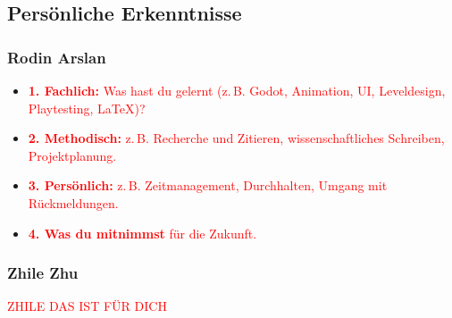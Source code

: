 \documentclass[../Main.tex]{subfiles}
\begin{document}
\subsection{Persönliche Erkenntnisse}

\subsubsection{Rodin Arslan}

\begin{itemize}[leftmargin=1.5cm]
    \item \textcolor{red}{\textbf{1. Fachlich:} Was hast du gelernt (z.\,B. Godot, Animation, UI, Leveldesign, Playtesting, \LaTeX)?}
    \item \textcolor{red}{\textbf{2. Methodisch:} z.\,B. Recherche und Zitieren, wissenschaftliches Schreiben, Projektplanung.}
    \item \textcolor{red}{\textbf{3. Persönlich:} z.\,B. Zeitmanagement, Durchhalten, Umgang mit Rückmeldungen.}
    \item \textcolor{red}{\textbf{4. Was du mitnimmst} für die Zukunft.}
\end{itemize}

\subsubsection{Zhile Zhu}

\textcolor{red}{ZHILE DAS IST FÜR DICH}
\end{document}
